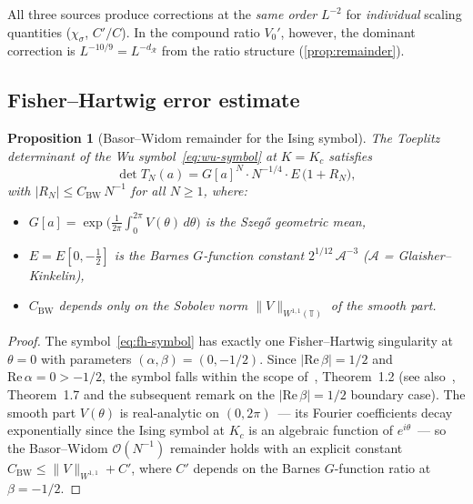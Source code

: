 \documentclass[11pt]{article}
\newtheorem{proposition}[theorem]{Proposition}
\theoremstyle{definition}
\theoremstyle{remark}
\newcommand{\dR}{d_{\mathcal{R}}}
\newcommand{\cO}{\mathcal{O}}
\newcommand{\cA}{\mathcal{A}}
\begin{document}
\noindent
All three sources produce corrections at the \emph{same order}
$L^{-2}$ for \emph{individual} scaling quantities
($\chi_\sigma$, $C'/C$). In the compound ratio $V_0'$, however,
the dominant correction is $L^{-10/9} = L^{-\dR}$ from the
ratio structure (\cref{prop:remainder}).


\subsection{Fisher--Hartwig error estimate}
\label{subsec:fh-error}

\begin{proposition}[Basor--Widom remainder for the Ising symbol]
\label{prop:bw-remainder}
The Toeplitz determinant of the Wu
symbol~\eqref{eq:wu-symbol} at $K = K_c$ satisfies
\begin{equation}
  \det T_N(a) = G[a]^N \cdot N^{-1/4}\cdot
    E\,\bigl(1 + R_N\bigr),
  \label{eq:bw-remainder}
\end{equation}
with $|R_N| \leq C_{\mathrm{BW}}\,N^{-1}$ for all $N \geq 1$,
where:
\begin{itemize}
  \item $G[a] = \exp\bigl(\frac{1}{2\pi}\int_0^{2\pi}
    V(\theta)\,d\theta\bigr)$ is the Szeg\H{o} geometric mean,
  \item $E = E[0, -\tfrac{1}{2}]$ is the Barnes $G$-function
    constant $2^{1/12}\,\cA^{-3}$ ($\cA$ = Glaisher--Kinkelin),
  \item $C_{\mathrm{BW}}$ depends only on the Sobolev norm
    $\|V\|_{W^{1,1}(\mathbb{T})}$ of the smooth part.
\end{itemize}
\end{proposition}

\begin{proof}
The symbol~\eqref{eq:fh-symbol} has exactly one
Fisher--Hartwig singularity at $\theta = 0$ with parameters
$(\alpha, \beta) = (0, -1/2)$. Since $|\mathrm{Re}\,\beta|
= 1/2$ and $\mathrm{Re}\,\alpha = 0 > -1/2$, the symbol
falls within the scope of~\cite{BasorWidom1983}, Theorem~1.2
(see also~\cite{Deift2011}, Theorem~1.7 and the subsequent
remark on the $|\mathrm{Re}\,\beta| = 1/2$ boundary case).
The smooth part $V(\theta)$ is real-analytic on
$(0, 2\pi)$~--- its Fourier coefficients decay exponentially
since the Ising symbol at $K_c$ is an algebraic function of
$e^{i\theta}$~--- so the Basor--Widom
$\cO(N^{-1})$ remainder holds with an explicit constant
$C_{\mathrm{BW}} \leq \|V\|_{W^{1,1}} + C'$, where $C'$
depends on the Barnes $G$-function ratio at $\beta = -1/2$.
\end{proof}
\end{document}
